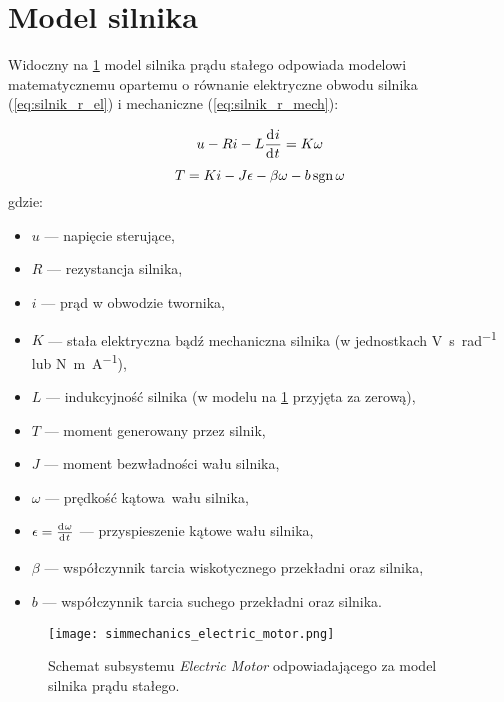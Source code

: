 \section{Model silnika}
\label{sec:ch4_model_silnika}

Widoczny na \cref{fig:sm_electric_motor} model silnika prądu stałego odpowiada modelowi matematycznemu opartemu o równanie elektryczne obwodu silnika (\ref{eq:silnik_r_el}) i mechaniczne (\ref{eq:silnik_r_mech}):

\begin{equation}\label{eq:silnik_r_el}
    u - R i - L \deriv{i}{t} = K \omega 
\end{equation}
\begin{equation}\label{eq:silnik_r_mech}
    T = K i - J \epsilon - \beta \omega - b \operatorname{sgn} \omega
\end{equation}
gdzie:
\begin{itemize}
    \item $u$ --- napięcie sterujące,
    \item $R$ --- rezystancja silnika,
    \item $i$ --- prąd w obwodzie twornika,
    \item $K$ --- stała elektryczna bądź mechaniczna silnika (w jednostkach \si{\volt\second\per\radian} lub \si{\newton\meter\per\ampere}),
    \item $L$ --- indukcyjność silnika (w modelu na \cref{fig:sm_electric_motor} przyjęta za zerową),
    \item $T$ --- moment generowany przez silnik,
    \item $J$ --- moment bezwładności wału silnika,
    \item $\omega$ --- prędkość kątowa wału silnika,
    \item $\epsilon = \deriv{\omega}{t}$ --- przyspieszenie kątowe wału silnika,
    \item $\beta$ --- współczynnik tarcia wiskotycznego przekładni oraz silnika,
    \item $b$ --- współczynnik tarcia suchego przekładni oraz silnika.
\end{itemize}

\begin{figure}[h]
    \centering
    \texttt{[image: simmechanics\_electric\_motor.png]}
    \caption{Schemat subsystemu \textit{Electric Motor} odpowiadającego za model silnika prądu stałego.}
    \label{fig:sm_electric_motor}
\end{figure}

